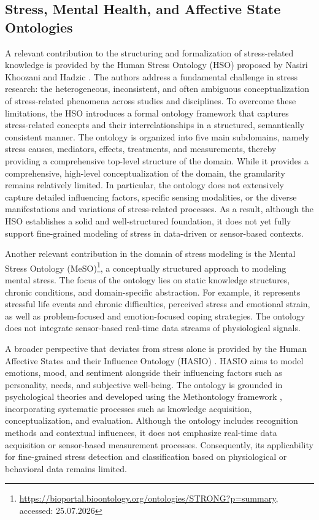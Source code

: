 \documentclass[
]{ceurart}
\begin{document}
\subsection{Stress, Mental Health, and Affective State Ontologies}

A relevant contribution to the structuring and formalization of stress-related knowledge is provided by the Human Stress Ontology (HSO) proposed by Nasiri Khoozani and Hadzic \cite{khoozani2010designing}. The authors address a fundamental challenge in stress research: the heterogeneous, inconsistent, and often ambiguous conceptualization of stress-related phenomena across studies and disciplines. To overcome these limitations, the HSO introduces a formal ontology framework that captures stress-related concepts and their interrelationships in a structured, semantically consistent manner. The ontology is organized into five main subdomains, namely stress causes, mediators, effects, treatments, and measurements, thereby providing a comprehensive top-level structure of the domain. While it provides a comprehensive, high-level conceptualization of the domain, the granularity remains relatively limited. In particular, the ontology does not extensively capture detailed influencing factors, specific sensing modalities, or the diverse manifestations and variations of stress-related processes. As a result, although the HSO establishes a solid and well-structured foundation, it does not yet fully support fine-grained modeling of stress in data-driven or sensor-based contexts.

Another relevant contribution in the domain of stress modeling is the Mental Stress Ontology (MeSO)\footnote{\url{https://bioportal.bioontology.org/ontologies/STRONG?p=summary}, accessed: 25.07.2026}, a conceptually structured approach to modeling mental stress. The focus of the ontology lies on static knowledge structures, chronic conditions, and domain-specific abstraction. For example, it represents stressful life events and chronic difficulties, perceived stress and emotional strain, as well as problem-focused and emotion-focused coping strategies. The ontology does not integrate sensor-based real-time data streams of physiological signals.

A broader perspective that deviates from stress alone is provided by the Human Affective States and their Influence Ontology (HASIO) \cite{abaalkhail2018ontology}. HASIO aims to model emotions, mood, and sentiment alongside their influencing factors such as personality, needs, and subjective well-being. The ontology is grounded in psychological theories and developed using the Methontology framework \cite{corcho2006ontological}, incorporating systematic processes such as knowledge acquisition, conceptualization, and evaluation. Although the ontology includes recognition methods and contextual influences, it does not emphasize real-time data acquisition or sensor-based measurement processes. Consequently, its applicability for fine-grained stress detection and classification based on physiological or behavioral data remains limited.
\end{document}
